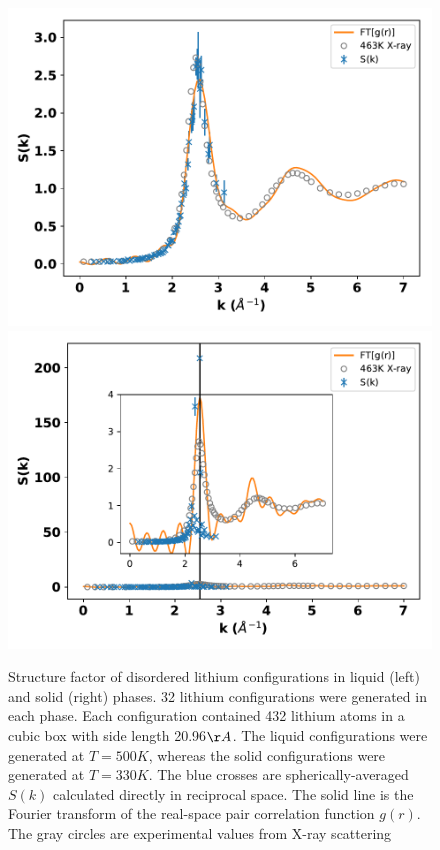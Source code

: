 \documentclass[aps,prl,superscriptaddress]{revtex4-1}
\begin{document}
\begin{figure}[h]
\includegraphics[scale=0.48]{figures/009d_amass-cont1_t500}
\includegraphics[scale=0.48]{figures/009d_amass-temp330}
\caption{Structure factor of disordered lithium configurations in liquid (left) and solid (right) phases. 32 lithium configurations were generated in each phase. Each configuration contained 432 lithium atoms in a cubic box with side length 20.96$\AA$. The liquid configurations were generated at $T=500K$, whereas the solid configurations were generated at $T=330K$. The blue crosses are spherically-averaged $S(k)$ calculated directly in reciprocal space. The solid line is the Fourier transform of the real-space pair correlation function $g(r)$. The gray circles are experimental values from X-ray scattering~\cite{Waseda1981,Mokshin2018}\label{fig:lisk}}
\end{figure}
\end{document}
